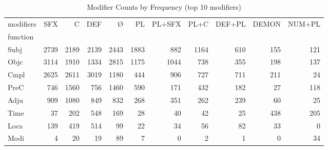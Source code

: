 \begin{table}[htbp!]
\centering
\caption{Modifier Counts by Frequency (top 10 modifiers)}
\label{table:functmod_ct_10}
\begin{adjustbox}{width=1\textwidth}
\begin{tabular}{lrrrrrrrrrr}
\toprule
modifiers &   SFX &     C &   DEF &     Ø &    PL &  PL+SFX &  PL+C &  DEF+PL &  DEMON &  NUM+PL \\
function &       &       &       &       &       &         &       &         &        &         \\
\midrule
Subj     &  2739 &  2189 &  2139 &  2443 &  1883 &     882 &  1164 &     610 &    155 &     121 \\
Objc     &  3114 &  1910 &  1334 &  2815 &  1175 &    1044 &   738 &     355 &    198 &     137 \\
Cmpl     &  2625 &  2611 &  3019 &  1180 &   444 &     906 &   727 &     711 &    211 &      24 \\
PreC     &   746 &  1560 &   756 &  1460 &   590 &     171 &   432 &     182 &     27 &     118 \\
Adju     &   909 &  1080 &   849 &   832 &   268 &     351 &   262 &     239 &     60 &      25 \\
Time     &    37 &   202 &   548 &   169 &    28 &      40 &    42 &      25 &    438 &     205 \\
Loca     &   139 &   419 &   514 &    99 &    22 &      34 &    56 &      82 &     33 &       0 \\
Modi     &     4 &    20 &    19 &    89 &     7 &       0 &     2 &       1 &      0 &      34 \\
\bottomrule
\end{tabular}
\end{adjustbox}
\end{table}
